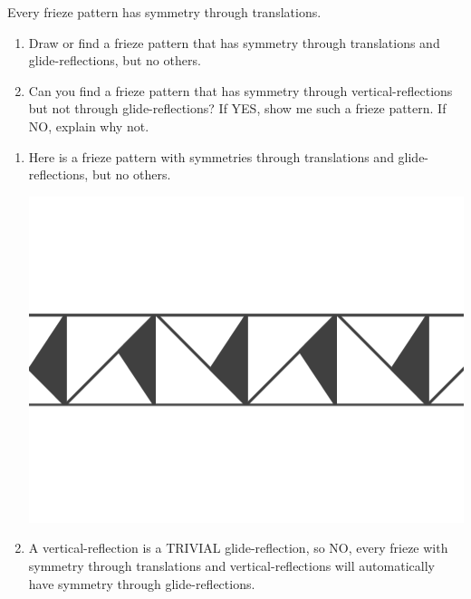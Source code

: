 \documentclass[noauthor,nooutcomes,hints,handout]{../ximera}
\begin{document}
\begin{question}
  Every frieze pattern has symmetry through translations.
  \begin{enumerate}
    \item Draw or find a frieze pattern that has symmetry through
      translations and glide-reflections, but no others.
    \item Can you find a frieze pattern that has symmetry through
      vertical-reflections but not through glide-reflections? If YES,
      show me such a frieze pattern. If NO, explain why not.
  \end{enumerate}
  \begin{freeResponse}
    \begin{enumerate}
      \item Here is a frieze pattern with symmetries through
        translations and glide-reflections, but no others.
        \begin{center}
          \includegraphics[width=.6\textwidth]{ansGR.png}
        \end{center}
      \item A vertical-reflection is a TRIVIAL glide-reflection, so
        NO, every frieze with symmetry through translations and
        vertical-reflections will automatically have symmetry through
        glide-reflections.
    \end{enumerate}
  \end{freeResponse}
\end{question}
\mynewpage
\end{document}
